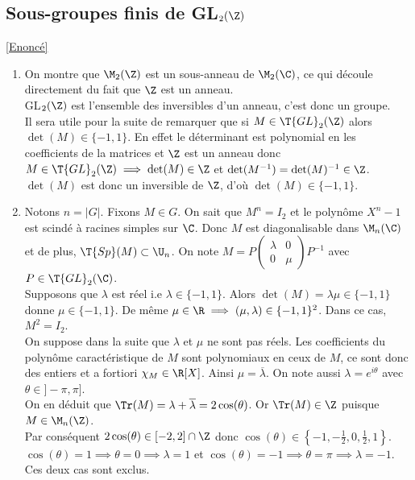 \documentclass[8pt]{book}
\begin{document}
	\subsection{Sous-groupes finis de GL$_2(\Z)$}
	\label{Sous-groupes finis de GL2(Z) corrigé}
	\textcolor{blue}{\hyperref[Sous-groupes finis de GL2(Z)]{[Enoncé]}}\\
	\begin{enumerate}
		\item On montre que $\M_2(\Z)$ est un sous-anneau de $\M_2(\C)$, ce qui découle directement du fait que $\Z$ est un anneau.\\
		GL$_2(\Z)$ est l'ensemble des inversibles d'un anneau, c'est donc un groupe.\\
		Il sera utile pour la suite de remarquer que si $M\in \T{GL}_2(\Z)$ alors $\det(M)\in \{-1,1\}$. En effet le déterminant est polynomial en les coefficients de la matrices et $\Z$ est un anneau donc $M\in \T{GL}_2(\Z)\implies \det(M)\in \Z$ et $\det(M^{-1})=\det(M)^{-1}\in \Z$. $\det(M)$ est donc un inversible de $\Z$, d'où $\det(M)\in \{-1,1\}$.
		\item Notons $n=|G|$. Fixons $M\in G$. On sait que $M^n=I_2$ et le polynôme $X^n-1$ est scindé à racines simples sur $\C$. Donc $M$ est diagonalisable dans $\M_n(\C)$ et de plus, $\T{Sp}(M)\subset \U_n$.
		On note $M=P\begin{pmatrix}\lambda&0\\0&\mu\end{pmatrix}P^{-1}$ avec $P\in \T{GL}_2(\C)$.\\
		Supposons que $\lambda$ est réel i.e $\lambda\in \{-1,1\}$. Alors $\det(M)=\lambda\mu\in \{-1,1\}$ donne $\mu\in \{-1,1\}$. De même $\mu\in \R\implies (\mu,\lambda)\in \{-1,1\}^2$. Dans ce cas, $M^2=I_2$.\\
		On suppose dans la suite que $\lambda$ et $\mu$ ne sont pas réels. Les coefficients du polynôme caractéristique de $M$ sont polynomiaux en ceux de $M$, ce sont donc des entiers et a fortiori $\chi_M\in \R[X]$. Ainsi $\mu=\overline \lambda$. On note aussi $\lambda=e^{i\theta}$ avec $\theta\in ]-\pi,\pi]$.\\
		On en déduit que $\Tr(M)=\lambda+\overline\lambda=2\cos(\theta)$. Or $\Tr(M)\in \Z$ puisque $M\in \M_n(\Z)$.\\
		Par conséquent $2\cos(\theta)\in [-2,2]\cap \Z$ donc $\cos(\theta)\in \displaystyle\left\{-1,-\frac{1}{2},0,\frac{1}{2},1\right\}$.\\
		$\cos(\theta)=1\implies \theta=0\implies \lambda=1$ et $\cos(\theta)=-1\implies \theta=\pi\implies \lambda=-1$. Ces deux cas sont exclus.\\

\end{enumerate}
\end{document}
